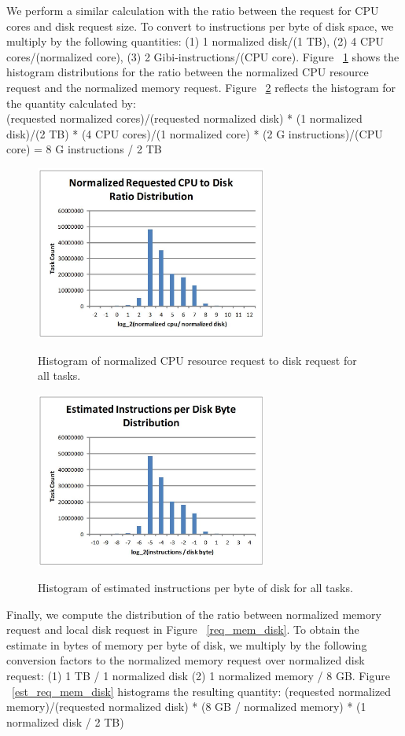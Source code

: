 \documentclass{sig-alternate}
\begin{document}
We perform a similar calculation with the ratio between the request for CPU cores and disk request size.
To convert to instructions per byte of disk space, we multiply by the following quantities: (1) 1 normalized disk/(1 TB), (2) 4 CPU cores/(normalized core), (3) 2 Gibi-instructions/(CPU core).
Figure ~\ref{req_cpu_disk} shows the histogram distributions for the ratio between the normalized CPU resource request and the normalized memory request.
Figure ~\ref{est_req_cpu_disk} reflects the histogram for the quantity calculated by: \\
(requested normalized cores)/(requested normalized disk) * (1 normalized disk)/(2 TB) * (4 CPU cores)/(1 normalized core) * (2 G instructions)/(CPU core) = 8 G instructions / 2 TB

\begin{figure}[t]
\centering
\includegraphics[width=3in]{../figures/req_cpu_disk.jpg}
\label{req_cpu_disk}
\caption{Histogram of normalized CPU resource request to disk request for all tasks.}
\end{figure}

\begin{figure}[t]
\centering
\includegraphics[width=3in]{../figures/est_req_cpu_disk.jpg}
\label{est_req_cpu_disk}
\caption{Histogram of estimated instructions per byte of disk for all tasks.}
\end{figure}

Finally, we compute the distribution of the ratio between normalized memory request and local disk request in Figure ~\ref{req_mem_disk}.
To obtain the estimate in bytes of memory per byte of disk, we multiply by the following conversion factors to the normalized memory request over normalized disk request: (1) 1 TB / 1 normalized disk (2) 1 normalized memory / 8 GB.
Figure ~\ref{est_req_mem_disk} histograms the resulting quantity:
(requested normalized memory)/(requested normalized disk) * (8 GB / normalized memory) * (1 normalized disk / 2 TB)
\end{document}

